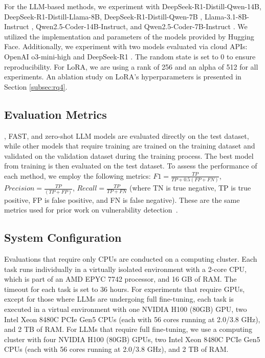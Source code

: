 \documentclass[12pt,openany,oneside,table]{cmuthesis}
\begin{document}
For the LLM-based methods, we experiment with 
DeepSeek-R1-Distill-Qwen-14B, DeepSeek-R1-Distill-Llama-8B, DeepSeek-R1-Distill-Qwen-7B \cite{deepseek2025deepseek}, Llama-3.1-8B-Instruct \cite{dubey2024llama}, Qwen2.5-Coder-14B-Instruct, and Qwen2.5-Coder-7B-Instruct \cite{qwen2.5}. We utilized the implementation and parameters of the models provided by Hugging Face. Additionally, we experiment with two models evaluated via cloud APIs: OpenAI o3-mini-high and DeepSeek-R1 \cite{deepseek2025deepseek}. The random state is set to 0 to ensure reproducibility.
For LoRA, we are using a rank of 256 and an alpha of 512 for all experiments. An ablation study on LoRA's hyperparameters is presented in Section \ref{subsec:rq4}.

\subsection{Evaluation Metrics}\label{subsec:experiment_metrics}

\nodemedicfine, FAST, and zero-shot LLM models are evaluated directly on the test dataset, while other models that require training are trained on the training dataset and validated on the validation dataset during the training process. The best model from training is then evaluated on the test dataset.
To assess the performance of each method, we employ the following metrics: $F1 = \frac{TP} {TP + 0.5(FP + FN)}$, $Precision = \frac{TP}{(TP + FP)}$, $Recall = \frac{TP}{TP + FN}$ (where TN is true negative, TP is true positive, FP is false positive, and FN is false negative).
These are the same metrics used for prior work on vulnerability detection~\cite{deepdfa, ivdetect, linevul, yang2024security}.

\subsection{System Configuration}\label{subsec:system_config}

Evaluations that require only CPUs are conducted on a computing cluster. Each task runs individually in a virtually isolated environment with a 2-core CPU, which is part of an AMD EPYC 7742 processor, and 16 GB of RAM. The timeout for each task is set to 36 hours. For experiments that require GPUs, except for those where LLMs are undergoing full fine-tuning, each task is executed in a virtual environment with one NVIDIA H100 (80GB) GPU, two Intel Xeon 8480C PCIe Gen5 CPUs (each with 56 cores running at 2.0/3.8 GHz), and 2 TB of RAM. For LLMs that require full fine-tuning, we use a computing cluster with four NVIDIA H100 (80GB) GPUs, two Intel Xeon 8480C PCIe Gen5 CPUs (each with 56 cores running at 2.0/3.8 GHz), and 2 TB of RAM. 
\end{document}
